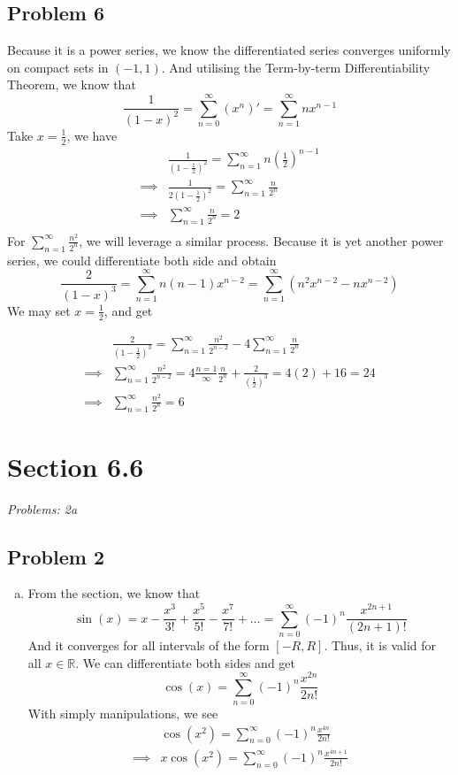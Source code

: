\documentclass[12pt]{article}
\begin{document}
\subsection*{Problem 6}
Because it is a power series, we know the differentiated series converges uniformly on compact sets in $(-1,1)$. 
And utilising the Term-by-term Differentiability Theorem, we know that 
$$\frac{1}{(1-x)^2} = \sum_{n=0}^{\infty}(x^n)' = \sum_{n=1}^{\infty}nx^{n-1}$$
Take $x = \frac{1}{2}$, we have
\begin{align*}
    &\frac{1}{(1-\frac{1}{2})^2} = \sum_{n=1}^{\infty}n\left(\frac{1}{2}\right)^{n-1} \\
    \implies &\frac{1}{2(1-\frac{1}{2})^2} = \sum_{n=1}^{\infty}\frac{n}{2^{n}} \\
    \implies &\sum_{n=1}^{\infty}\frac{n}{2^{n}} = 2 \\
\end{align*}
For $\sum_{n=1}^{\infty}\frac{n^2}{2^n}$, we will leverage a similar process.
Because it is yet another power series, we could differentiate both side and obtain
$$\frac{2}{(1-x)^3} = \sum_{n=1}^{\infty}n(n-1)x^{n-2} = \sum_{n=1}^{\infty}\left( n^2x^{n-2} - nx^{n-2}\right)$$
We may set $x = \frac{1}{2}$, and get

\begin{align*}
    &\frac{2}{\left( 1 - \frac{1}{2}\right)^3} = \sum_{n= 1}^{\infty}\frac{n^2}{2^{n-2}} - 4\sum_{n=1}^{\infty}\frac{n}{2^{n}}\\
    \implies &\sum_{n=1}^{\infty}\frac{n^2}{2^{n-2}} = 4 \frac{n = 1}{\infty}\frac{n}{2^n} + \frac{2}{\left( \frac{1}{2}\right)^3} = 4(2) + 16 = 24 \\
    \implies & \sum_{n = 1}^{\infty} \frac{n^2}{2^n} = 6
\end{align*}


\vspace*{1cm}


\section*{Section 6.6}
\textit{Problems: 2a}

\subsection*{Problem 2}
\begin{enumerate}[a).]
    \item {
        From the section, we know that 
        $$\sin(x) = x - \frac{x^3}{3!} + \frac{x^5}{5!} - \frac{x^7}{7!} + \dots = \sum_{n=0}^{\infty}(-1)^n\frac{x^{2n+1}}{(2n+1)!}$$
        And it converges for all intervals of the form $[-R, R]$. 
        Thus, it is valid for all $x \in \mathbb{R}$. 
        We can differentiate both sides and get
        $$\cos(x) = \sum_{n=0}^{\infty}(-1)^n\frac{x^{2n}}{2n!}$$
        With simply manipulations, we see
        \begin{align*}
            &\cos(x^2) = \sum_{n=0}^{\infty}(-1)^n\frac{x^{4n}}{2n!} \\
            \implies & x\cos(x^2) = \sum_{n=0}^{\infty}(-1)^n\frac{x^{4n+1}}{2n!}
        \end{align*}
    }
\end{enumerate}
\end{document}
